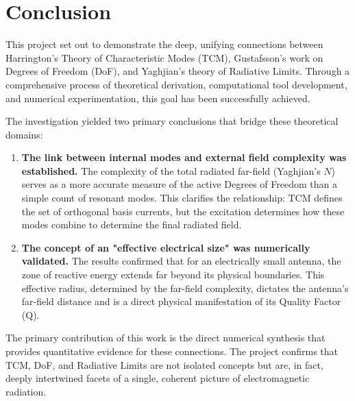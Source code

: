 \documentclass[11pt, a4paper]{report}
\begin{document}
\newpage

\chapter{Conclusion}

This project set out to demonstrate the deep, unifying connections between Harrington's Theory of Characteristic Modes (TCM), Gustafsson's work on Degrees of Freedom (DoF), and Yaghjian's theory of Radiative Limits. Through a comprehensive process of theoretical derivation, computational tool development, and numerical experimentation, this goal has been successfully achieved.

The investigation yielded two primary conclusions that bridge these theoretical domains:
\begin{enumerate}
    \item \textbf{The link between internal modes and external field complexity was established.} The complexity of the total radiated far-field (Yaghjian's $N$) serves as a more accurate measure of the active Degrees of Freedom than a simple count of resonant modes. This clarifies the relationship: TCM defines the set of orthogonal basis currents, but the excitation determines how these modes combine to determine the final radiated field.
    \item \textbf{The concept of an "effective electrical size" was numerically validated.} The results confirmed that for an electrically small antenna, the zone of reactive energy extends far beyond its physical boundaries. This effective radius, determined by the far-field complexity, dictates the antenna's far-field distance and is a direct physical manifestation of its Quality Factor (Q).
\end{enumerate}

The primary contribution of this work is the direct numerical synthesis that provides quantitative evidence for these connections. The project confirms that TCM, DoF, and Radiative Limits are not isolated concepts but are, in fact, deeply intertwined facets of a single, coherent picture of electromagnetic radiation.
\end{document}
